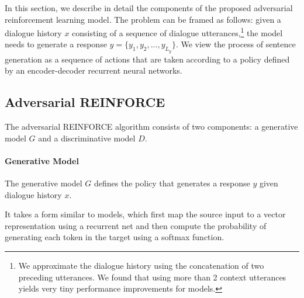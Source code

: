 In this section, we describe in detail the components of the proposed adversarial reinforcement learning model. 
The problem can be framed as follows: given a dialogue history $x$ consisting of a sequence of dialogue utterances,\footnote{We approximate the dialogue history using the concatenation of two preceding utterances. We found that using more than 2 context utterances yields very tiny performance improvements for \sts models.} the model needs to generate a response $y=\{y_1,y_2,...,y_{L_y}\}$.
 We view the 
 process of sentence generation 
   as a sequence of actions that are taken according to a policy defined by an
encoder-decoder recurrent neural networks.

\begin{comment}
The learning system consists of two agents. 
We use $p$ to denote sentences generated from the first agent and  $q$ to denote sentences from the second. The two agents take turns talking with each other. A dialogue can be represented as an alternating sequence of sentences generated by the two agents: $U=\{p_1, q_1, p_2, q_2, ..., p_{i}, q_{i}\}$.  We view the generated sentences as actions that are taken according to a policy defined by an
encoder-decoder recurrent neural networks.
\end{comment}
\subsection{Adversarial REINFORCE}
The adversarial REINFORCE algorithm consists of two components:
a generative model $G$ and a discriminative model $D$.

\paragraph{Generative Model} The generative model $G$ defines the
 policy that generates a response $y$ given dialogue history $x$. 
 \begin{comment}
  , namely $p_{i}=\{w_1,w_2,...,w_N\}$, 
  given the dialogue history, denoted $\pi(p_{i}|p_{i-1},q_{i-1})$.\footnote{ We found that using more than 2 context yields very tiny performance boost.
We therefore approximate the dialogue history using the concatenation of two preceding utterances. }
\end{comment}
It takes a  form similar to \sts models, which first map the source input to a vector representation using a recurrent net
and then compute the probability of generating each token in the target using a softmax function.
\begin{comment}
\begin{equation}
\begin{aligned}
&\pi(p_{i}|p_{i-1},q_{i-1})=\\
&~~~~~~~~~\prod_{w_t\in p_{i}} \pi(w_t|w_1,...,w_{t-1},p_{i-1},q_{i-1})
\end{aligned}
\label{eq2}
\end{equation}
\end{comment}

